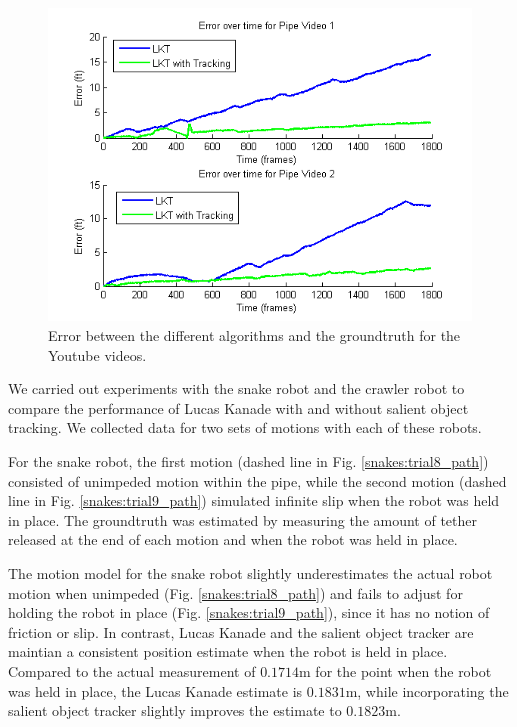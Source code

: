 \documentclass[letterpaper, 10 pt, conference]{ieeeconf}
\begin{document}
\begin{figure}[tb]
	\centering
	\includegraphics[width=\columnwidth]{youtube_err_v_time.png}
	\caption{Error between the different algorithms and the groundtruth for the Youtube videos.}
    \label{youtube:error_over_time}
\end{figure}


We carried out experiments with the snake robot and the crawler robot to compare the performance of Lucas Kanade with and without salient object tracking. We collected data for two sets of motions with each of these robots.

For the snake robot, the first motion (dashed line in Fig. \ref{snakes:trial8_path}) consisted of unimpeded motion within the pipe, while the second motion (dashed line in Fig. \ref{snakes:trial9_path}) simulated infinite slip when the robot was held in place. The groundtruth was estimated by measuring the amount of tether released at the end of each motion and when the robot was held in place.

The motion model for the snake robot slightly underestimates the actual robot motion when unimpeded (Fig. \ref{snakes:trial8_path}) and fails to adjust for holding the robot in place (Fig. \ref{snakes:trial9_path}), since it has no notion of friction or slip. In contrast, Lucas Kanade and the salient object tracker are maintian a consistent position estimate when the robot is held in place. Compared to the actual measurement of $0.1714$m for the point when the robot was held in place, the Lucas Kanade estimate is $0.1831$m, while incorporating the salient object tracker slightly improves the estimate to $0.1823$m. 
\end{document}
